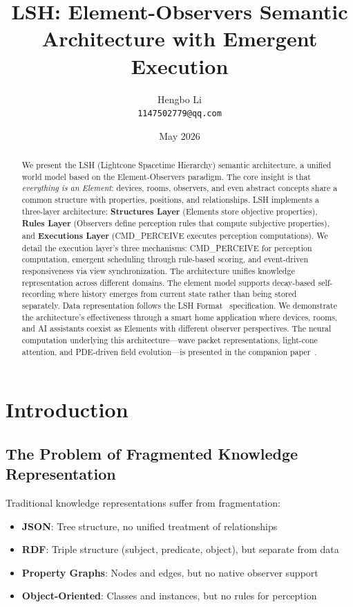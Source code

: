 \documentclass{article}
\title{LSH: Element-Observers Semantic Architecture with Emergent Execution}
\author{Hengbo Li\\
\texttt{1147502779@qq.com}
}
\date{May 2026}
\begin{document}
\maketitle

\begin{abstract}
We present the LSH (Lightcone Spacetime Hierarchy) semantic architecture, a unified world model based on the Element-Observers paradigm. The core insight is that \emph{everything is an Element}: devices, rooms, observers, and even abstract concepts share a common structure with properties, positions, and relationships. LSH implements a three-layer architecture: \textbf{Structures Layer} (Elements store objective properties), \textbf{Rules Layer} (Observers define perception rules that compute subjective properties), and \textbf{Executions Layer} (CMD\_PERCEIVE executes perception computations). We detail the execution layer's three mechanisms: CMD\_PERCEIVE for perception computation, emergent scheduling through rule-based scoring, and event-driven responsiveness via view synchronization. The architecture unifies knowledge representation across different domains. The element model supports decay-based self-recording where history emerges from current state rather than being stored separately. Data representation follows the LSH Format~\cite{lsh-format} specification. We demonstrate the architecture's effectiveness through a smart home application where devices, rooms, and AI assistants coexist as Elements with different observer perspectives. The neural computation underlying this architecture---wave packet representations, light-cone attention, and PDE-driven field evolution---is presented in the companion paper~\cite{lsh-sfa}.
\end{abstract}

\section{Introduction}

\subsection{The Problem of Fragmented Knowledge Representation}

Traditional knowledge representations suffer from fragmentation:

\begin{itemize}
\item \textbf{JSON}: Tree structure, no unified treatment of relationships
\item \textbf{RDF}: Triple structure (subject, predicate, object), but separate from data
\item \textbf{Property Graphs}: Nodes and edges, but no native observer support
\item \textbf{Object-Oriented}: Classes and instances, but no rules for perception
\end{itemize}
\end{document}

